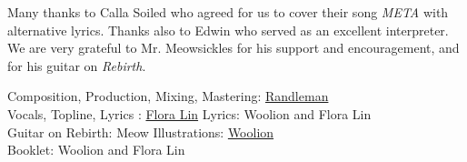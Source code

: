 
\vspace*{\fill}


Many thanks to Calla Soiled who agreed for us to cover their song \textit{META} with alternative lyrics.
Thanks also to Edwin who served as an excellent interpreter.
We are very grateful to Mr. Meowsickles for his support and encouragement, and for his guitar on \textit{Rebirth}.


Composition, Production, Mixing, Mastering: \href{https://linktr.ee/randleman}{Randleman}\\
Vocals, Topline, Lyrics : \href{https://www.youtube.com/channel/UC7pM7YKe9U1D1Xl4s_xroBw}{Flora Lin}
Lyrics: Woolion and Flora Lin\\
Guitar on Rebirth: Meow
Illustrations: \href{https://twitter.com/wooliondraws}{Woolion}\\
Booklet: Woolion and Flora Lin
